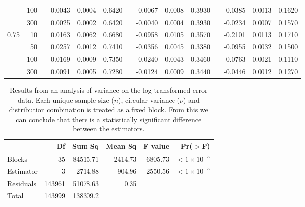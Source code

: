 \begin{table}[h!]
\begin{center}
{\begin{tabular}{rrcrrrcrrrcrrr}
  &   100 && 0.0043 & 0.0004 & 0.6420 && -0.0067 & 0.0008 & 0.3930 && -0.0385 & 0.0013 & 0.1620 \\ 
  &   300 && 0.0025 & 0.0002 & 0.6420 && -0.0040 & 0.0004 & 0.3930 && -0.0234 & 0.0007 & 0.1570 \\ \hline
0.75  &    10 && 0.0163 & 0.0062 & 0.6680 && -0.0958 & 0.0105 & 0.3570 && -0.2101 & 0.0113 & 0.1710 \\ 
  &    50 && 0.0257 & 0.0012 & 0.7410 && -0.0356 & 0.0045 & 0.3380 && -0.0955 & 0.0032 & 0.1500 \\ 
  &   100 && 0.0169 & 0.0009 & 0.7350 && -0.0240 & 0.0043 & 0.3460 && -0.0763 & 0.0021 & 0.1110 \\ 
  &   300 && 0.0091 & 0.0005 & 0.7280 && -0.0124 & 0.0009 & 0.3440 && -0.0446 & 0.0012 & 0.1270 \\
   \hline
\end{tabular}}
\end{center}
\end{table}


\begin{table}[h!]
\caption{Results from an analysis of variance on the log transformed error data.  Each unique sample size ($n$), circular variance ($\nu$) and distribution combination is treated as a fixed block.  From this we can conclude that there is a statistically significant difference between the estimators.}
\begin{center}
\begin{tabular}{lrrrrr}
  \hline
 & Df & Sum Sq & Mean Sq & F value & Pr($>$F) \\ 
  \hline
Blocks      & 35 & 84515.71 & 2414.73 & 6805.73 & $<1\times 10^{-5}$ \\ 
Estimator   & 3 & 2714.88 & 904.96 & 2550.56 & $<1\times 10^{-5}$ \\ 
Residuals   & 143961 & 51078.63 & 0.35 &  &  \\ \hline
Total & 143999 & 138309.2&&&\\
   \hline
\end{tabular}
\end{center}
\end{table}

